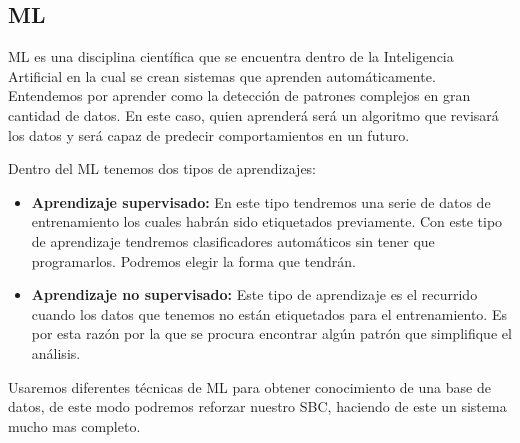 \subsection{\acl{ML}}
\acf{ML} es una disciplina científica que se encuentra dentro de la Inteligencia
 Artificial en la cual se crean sistemas que aprenden automáticamente. Entendemos por aprender
 como la detección de patrones complejos en gran cantidad de datos. En este caso, quien aprenderá
 será un algoritmo que revisará los datos y será capaz de predecir comportamientos en un futuro.

Dentro del \acs{ML} tenemos dos tipos de aprendizajes:

\begin{itemize}
  \item \textbf{Aprendizaje supervisado:} En este tipo tendremos una serie de datos de entrenamiento
    los cuales habrán sido etiquetados previamente. Con este tipo de aprendizaje tendremos clasificadores
    automáticos sin tener que programarlos. Podremos elegir la forma que tendrán.
  \item \textbf{Aprendizaje no supervisado:} Este tipo de aprendizaje es el recurrido cuando
    los datos que tenemos no están etiquetados para el entrenamiento. Es por esta razón por la que
    se procura encontrar algún patrón que simplifique el análisis.
\end{itemize}

Usaremos diferentes técnicas de ML para obtener conocimiento de una base de datos, de este modo
podremos reforzar nuestro \acs{SBC}, haciendo de este un sistema mucho mas
completo.

